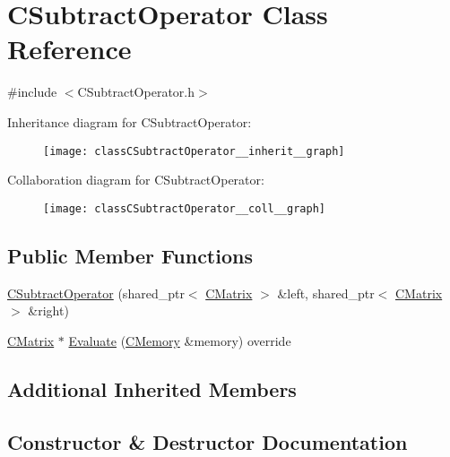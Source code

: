\hypertarget{classCSubtractOperator}{}\section{C\+Subtract\+Operator Class Reference}
\label{classCSubtractOperator}


{\ttfamily \#include $<$C\+Subtract\+Operator.\+h$>$}



Inheritance diagram for C\+Subtract\+Operator\+:\nopagebreak
\begin{figure}[H]
\begin{center}
\leavevmode
\texttt{[image: classCSubtractOperator\_\_inherit\_\_graph]}
\end{center}
\end{figure}


Collaboration diagram for C\+Subtract\+Operator\+:\nopagebreak
\begin{figure}[H]
\begin{center}
\leavevmode
\texttt{[image: classCSubtractOperator\_\_coll\_\_graph]}
\end{center}
\end{figure}
\subsection*{Public Member Functions}
\begin{DoxyCompactItemize}
\item 
\hyperlink{classCSubtractOperator_a8a17b585966d93c00fbfef857e7789cf}{C\+Subtract\+Operator} (shared\+\_\+ptr$<$ \hyperlink{classCMatrix}{C\+Matrix} $>$ \&left, shared\+\_\+ptr$<$ \hyperlink{classCMatrix}{C\+Matrix} $>$ \&right)
\item 
\hyperlink{classCMatrix}{C\+Matrix} $\ast$ \hyperlink{classCSubtractOperator_a0caad8afe8a56c60e14f2276e7ec1f2d}{Evaluate} (\hyperlink{classCMemory}{C\+Memory} \&memory) override
\end{DoxyCompactItemize}
\subsection*{Additional Inherited Members}


\subsection{Constructor \& Destructor Documentation}
